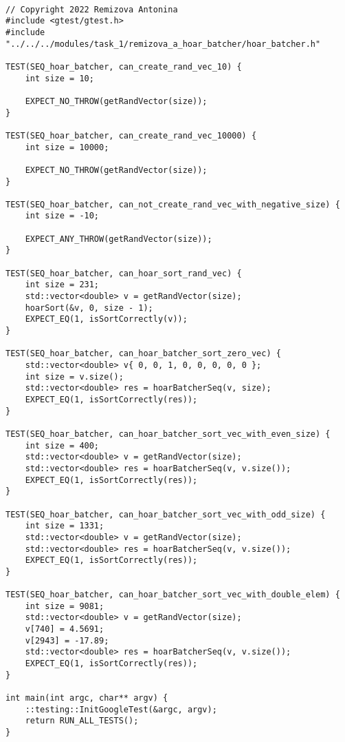 \documentclass{report}
\begin{document}
\begin{lstlisting}

// Copyright 2022 Remizova Antonina
#include <gtest/gtest.h>
#include "../../../modules/task_1/remizova_a_hoar_batcher/hoar_batcher.h"

TEST(SEQ_hoar_batcher, can_create_rand_vec_10) {
    int size = 10;

    EXPECT_NO_THROW(getRandVector(size));
}

TEST(SEQ_hoar_batcher, can_create_rand_vec_10000) {
    int size = 10000;

    EXPECT_NO_THROW(getRandVector(size));
}

TEST(SEQ_hoar_batcher, can_not_create_rand_vec_with_negative_size) {
    int size = -10;

    EXPECT_ANY_THROW(getRandVector(size));
}

TEST(SEQ_hoar_batcher, can_hoar_sort_rand_vec) {
    int size = 231;
    std::vector<double> v = getRandVector(size);
    hoarSort(&v, 0, size - 1);
    EXPECT_EQ(1, isSortCorrectly(v));
}

TEST(SEQ_hoar_batcher, can_hoar_batcher_sort_zero_vec) {
    std::vector<double> v{ 0, 0, 1, 0, 0, 0, 0, 0 };
    int size = v.size();
    std::vector<double> res = hoarBatcherSeq(v, size);
    EXPECT_EQ(1, isSortCorrectly(res));
}

TEST(SEQ_hoar_batcher, can_hoar_batcher_sort_vec_with_even_size) {
    int size = 400;
    std::vector<double> v = getRandVector(size);
    std::vector<double> res = hoarBatcherSeq(v, v.size());
    EXPECT_EQ(1, isSortCorrectly(res));
}

TEST(SEQ_hoar_batcher, can_hoar_batcher_sort_vec_with_odd_size) {
    int size = 1331;
    std::vector<double> v = getRandVector(size);
    std::vector<double> res = hoarBatcherSeq(v, v.size());
    EXPECT_EQ(1, isSortCorrectly(res));
}

TEST(SEQ_hoar_batcher, can_hoar_batcher_sort_vec_with_double_elem) {
    int size = 9081;
    std::vector<double> v = getRandVector(size);
    v[740] = 4.5691;
    v[2943] = -17.89;
    std::vector<double> res = hoarBatcherSeq(v, v.size());
    EXPECT_EQ(1, isSortCorrectly(res));
}

int main(int argc, char** argv) {
    ::testing::InitGoogleTest(&argc, argv);
    return RUN_ALL_TESTS();
}

\end{lstlisting}
\newpage
\end{document}
